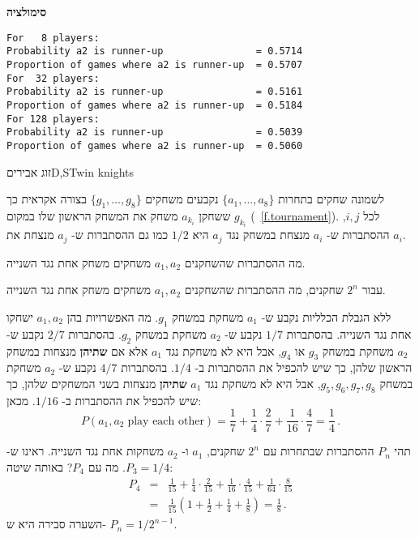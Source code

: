 \textbf{סימולציה}
\begin{verbatim}
For   8 players:
Probability a2 is runner-up                = 0.5714
Proportion of games where a2 is runner-up  = 0.5707
For  32 players:
Probability a2 is runner-up                = 0.5161
Proportion of games where a2 is runner-up  = 0.5184
For 128 players:
Probability a2 is runner-up                = 0.5039
Proportion of games where a2 is runner-up  = 0.5060
\end{verbatim}


\begin{prob}{זוג אבירים}{D,S}{Twin knights}

לשמונה שחקים בתחרות 
$\{a_1,\ldots,a_8\}$
נקבעים משחקים 
$\{g_1,\ldots,g_8\}$
בצורה אקראית כך ששחקן
$a_{k_{i}}$
משחק את המשחק הראשון שלו במקום
$g_{k_{i}}$ (~\ref{f.tournament}).
לכל
$i,j$, 
ההסתברות ש-%
$a_i$
מנצחת במשחק נגד 
$a_j$
היא 
$1/2$
כמו גם ההסתברות ש-%
$a_j$
מנצחת את
$a_i$.

מה ההסתברות שהשחקנים
$a_1,a_2$
משחקים משחק אחת נגד השנייה.

עבור
$2^n$ 
שחקנים, מה ההסתברות שהשחקנים
$a_1,a_2$
משחקים משחק אחת נגד השנייה.
\end{prob}

\solution{}

ללא הגבלת הכלליות נקבע ש-%
$a_1$
משחקת במשחק
$g_1$.
מה האפשרויות בהן 
$a_1,a_2$
ישחקו אחת נגד השנייה. בהסתברות 
$1/7$
נקבע ש-%
$a_2$
משחקת במשחק
$g_2$.
בהסתברות
$2/7$
נקבע ש-%
$a_2$
משחקת במשחק 
$g_3$
או
$g_4$,
אבל היא לא משחקת נגד 
$a_1$
אלא אם
\textbf{שתיהן}
מנצחות במשחק הראשון שלהן, כך שיש להכפיל את ההסתברות ב-%
$1/4$.
בהסתברות
$4/7$
נקבע ש-%
$a_2$
משחקת במשחק
$g_5,g_6,g_7,g_8$, 
אבל היא לא משחקת נגד 
$a_1$
\textbf{שתיהן}
מנצחות בשני המשחקים שלהן, כך שיש להכפיל את ההסתברות ב-%
$1/16$.
מכאן:
\[
P(a_1, a_2\;\textrm{play each other})=\frac{1}{7} + \frac{1}{4}\cdot \frac{2}{7} + \frac{1}{16}\cdot \frac{4}{7} =\frac{1}{4}\,.
\]

תהי 
$P_n$
ההסתברות שבתחרות עם 
$2^n$
שחקנים,
$a_1$
ו-%
$a_2$
משחקות אחת נגד השנייה. ראינו ש-%
$P_3=1/4$.
מה עם
$P_4$?
באותה שיטה:
\begin{eqnarray*}
P_4 &=& \frac{1}{15} + \frac{1}{4}\cdot \frac{2}{15}  + \frac{1}{16}\cdot \frac{4}{15}  + \frac{1}{64}\cdot \frac{8}{15} \\
&=&\frac{1}{15}\left(1+\frac{1}{2}+\frac{1}{4}+\frac{1}{8}\right)=\frac{1}{8}\,.
\end{eqnarray*}
השערה סבירה היא ש-%
$P_n=1/2^{n-1}$.

